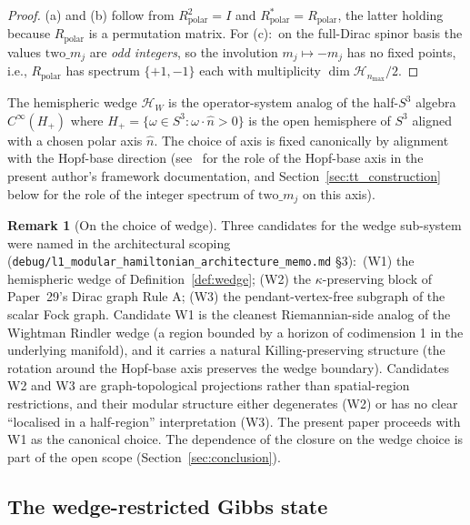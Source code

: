 \documentclass[11pt,a4paper]{article}
\theoremstyle{plain}
\theoremstyle{definition}
\newtheorem{remark}[theorem]{Remark}
\newcommand{\nmax}{n_{\max}}
\newcommand{\sthree}{S^{3}}
\newcommand{\Hilb}{\mathcal{H}}
\begin{document}
\begin{proof}
(a) and (b) follow from $R_{\mathrm{polar}}^2 = I$ and
$R_{\mathrm{polar}}^* = R_{\mathrm{polar}}$, the latter holding because
$R_{\mathrm{polar}}$ is a permutation matrix. For (c):\ on the
full-Dirac spinor basis the values $\mathrm{two}\_m_j$ are
\emph{odd integers}, so the involution $m_j \mapsto -m_j$ has no fixed
points, i.e., $R_{\mathrm{polar}}$ has spectrum $\{+1, -1\}$ each with
multiplicity $\dim \Hilb_{\nmax}/2$.
\end{proof}

The hemispheric wedge $\Hilb_W$ is the operator-system analog of the
half-$\sthree$ algebra $C^\infty(H_+)$ where $H_+ = \{\omega \in
\sthree : \omega \cdot \hat{n} > 0\}$ is the open hemisphere of
$\sthree$ aligned with a chosen polar axis $\hat{n}$. The choice of
axis is fixed canonically by alignment with the Hopf-base direction
(see~\cite[\S V.3]{paper25_hopf_gauge_structure} for the role of the
Hopf-base axis in the present author's framework documentation, and
Section~\ref{sec:tt_construction} below for the role of the integer
spectrum of $\mathrm{two}\_m_j$ on this axis).

\begin{remark}[On the choice of wedge]\label{rem:wedge_choice}
Three candidates for the wedge sub-system were named in the architectural
scoping (\texttt{debug/l1\_modular\_hamiltonian\_architecture\_memo.md}
\S 3):\ (W1) the hemispheric wedge of Definition~\ref{def:wedge};
(W2) the $\kappa$-preserving block of Paper~29's Dirac graph Rule A;
(W3) the pendant-vertex-free subgraph of the scalar Fock graph.
Candidate W1 is the cleanest Riemannian-side analog of the Wightman
Rindler wedge (a region bounded by a horizon of codimension 1 in the
underlying manifold), and it carries a natural Killing-preserving
structure (the rotation around the Hopf-base axis preserves the
wedge boundary). Candidates W2 and W3 are graph-topological
projections rather than spatial-region restrictions, and their modular
structure either degenerates (W2) or has no clear ``localised in a
half-region'' interpretation (W3). The present paper proceeds with W1
as the canonical choice. The dependence of the closure on the wedge
choice is part of the open scope (Section~\ref{sec:conclusion}).
\end{remark}

\subsection{The wedge-restricted Gibbs state}\label{sec:kms_state}
\end{document}

